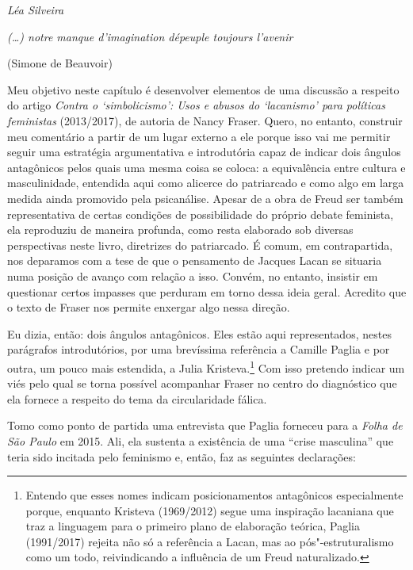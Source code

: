 

\begin{flushright}
\emph{Léa Silveira}
\end{flushright}

\epigraph{\emph{(\ldots{}) notre manque d'imagination dépeuple toujours l'avenir}}{(Simone de Beauvoir)}

Meu objetivo neste capítulo é desenvolver elementos de uma discussão a
respeito do artigo \emph{Contra o `simbolicismo': Usos e abusos do
`lacanismo' para políticas feministas} (2013/2017), de autoria de Nancy
Fraser. Quero, no entanto, construir meu comentário a partir de um lugar
externo a ele porque isso vai me permitir seguir uma estratégia
argumentativa e introdutória capaz de indicar dois ângulos antagônicos
pelos quais uma mesma coisa se coloca: a equivalência entre cultura e
masculinidade, entendida aqui como alicerce do patriarcado e como algo
em larga medida ainda promovido pela psicanálise. Apesar de a obra de
Freud ser também representativa de certas condições de possibilidade do
próprio debate feminista, ela reproduziu de maneira profunda, como resta
elaborado sob diversas perspectivas neste livro, diretrizes do
patriarcado. É comum, em contrapartida, nos deparamos com a tese de que
o pensamento de Jacques Lacan se situaria numa posição de avanço com
relação a isso. Convém, no entanto, insistir em questionar certos
impasses que perduram em torno dessa ideia geral. Acredito que o texto
de Fraser nos permite enxergar algo nessa direção.

Eu dizia, então: dois ângulos antagônicos. Eles estão aqui
representados, nestes parágrafos introdutórios, por uma brevíssima
referência a Camille Paglia e por outra, um pouco mais estendida, a
Julia Kristeva.\footnote{Entendo que esses nomes indicam posicionamentos
  antagônicos especialmente porque, enquanto Kristeva (1969/2012) segue
  uma inspiração lacaniana que traz a linguagem para o primeiro plano de
  elaboração teórica, Paglia (1991/2017) rejeita não só a referência a
  Lacan, mas ao pós"-estruturalismo como um todo, reivindicando a
  influência de um Freud naturalizado.} Com isso pretendo indicar um
viés pelo qual se torna possível acompanhar Fraser no centro do
diagnóstico que ela fornece a respeito do tema da circularidade fálica.

Tomo como ponto de partida uma entrevista que Paglia forneceu para a
\emph{Folha de São Paulo} em 2015. Ali, ela sustenta a existência de uma
``crise masculina'' que teria sido incitada pelo feminismo e, então, faz
as seguintes declarações:


